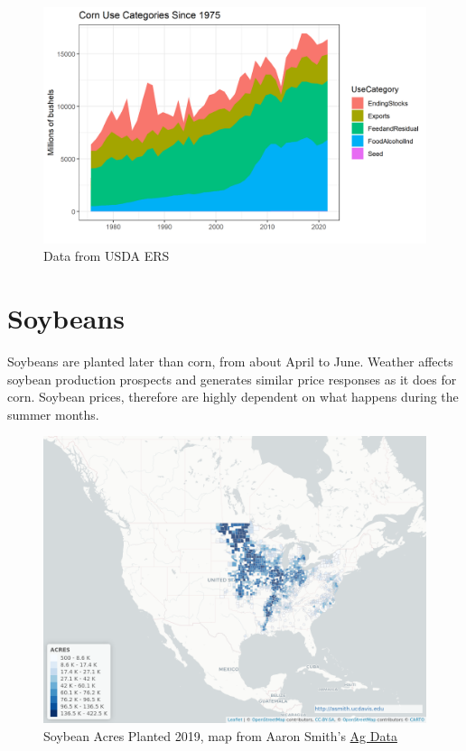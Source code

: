 \documentclass[
  letterpaper,
  DIV=11,
  numbers=noendperiod]{scrreprt}
\begin{document}
\begin{figure}

{\centering \includegraphics{assets/PrimerforGrain_CornUse.png}

}

\caption{Data from USDA ERS}

\end{figure}

\hypertarget{soybeans}{%
\section{Soybeans}\label{soybeans}}

Soybeans are planted later than corn, from about April to June. Weather
affects soybean production prospects and generates similar price
responses as it does for corn. Soybean prices, therefore are highly
dependent on what happens during the summer months.

\begin{figure}

{\centering \includegraphics{assets/map_SOYBEANS_AREA PLANTED.png}

}

\caption{Soybean Acres Planted 2019, map from Aaron Smith's
\href{https://asmith.ucdavis.edu/data/us-crops}{Ag Data}}

\end{figure}
\end{document}
